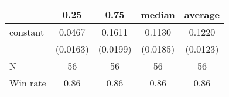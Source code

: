 \begin{tabular}{lcccc}
\hline
         &   0.25   &   0.75   &  median  & average   \\
\midrule
\midrule
constant & 0.0467   & 0.1611   & 0.1130   & 0.1220    \\
         & (0.0163) & (0.0199) & (0.0185) & (0.0123)  \\
N        & 56       & 56       & 56       & 56        \\
Win rate & 0.86     & 0.86     & 0.86     & 0.86      \\
\hline
\end{tabular}